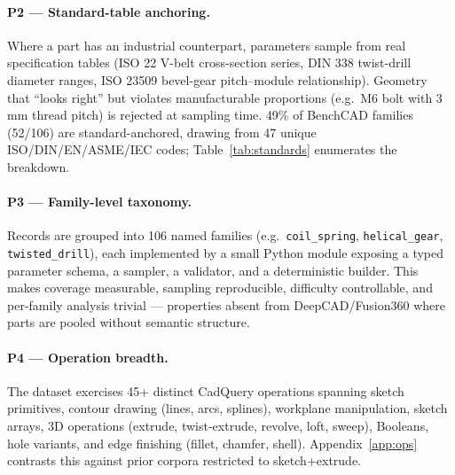 \documentclass{article}
\begin{document}
\paragraph{P2 --- Standard-table anchoring.} Where a part has an industrial counterpart, parameters sample from real specification tables (ISO 22 V-belt cross-section series, DIN 338 twist-drill diameter ranges, ISO 23509 bevel-gear pitch--module relationship). Geometry that ``looks right'' but violates manufacturable proportions (e.g.\ M6 bolt with 3\,mm thread pitch) is rejected at sampling time. 49\% of BenchCAD families (52/106) are standard-anchored, drawing from 47 unique ISO/DIN/EN/ASME/IEC codes; Table~\ref{tab:standards} enumerates the breakdown.

\paragraph{P3 --- Family-level taxonomy.} Records are grouped into 106 named families (e.g.\ \texttt{coil\_spring}, \texttt{helical\_gear}, \texttt{twisted\_drill}), each implemented by a small Python module exposing a typed parameter schema, a sampler, a validator, and a deterministic builder. This makes coverage measurable, sampling reproducible, difficulty controllable, and per-family analysis trivial --- properties absent from DeepCAD/Fusion360 where parts are pooled without semantic structure.

\paragraph{P4 --- Operation breadth.} The dataset exercises 45+ distinct CadQuery operations spanning sketch primitives, contour drawing (lines, arcs, splines), workplane manipulation, sketch arrays, 3D operations (extrude, twist-extrude, revolve, loft, sweep), Booleans, hole variants, and edge finishing (fillet, chamfer, shell). Appendix~\ref{app:ops} contrasts this against prior corpora restricted to sketch+extrude.
\end{document}
